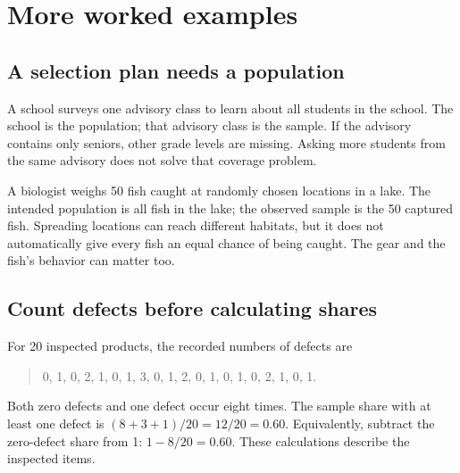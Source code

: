 \documentclass[12pt,letterpaper]{article}
\begin{document}
\section*{More worked examples}
\subsection*{A selection plan needs a population}
A school surveys one advisory class to learn about all students in the school. The school is the population; that advisory class is the sample. If the advisory contains only seniors, other grade levels are missing. Asking more students from the same advisory does not solve that coverage problem.

A biologist weighs 50 fish caught at randomly chosen locations in a lake. The intended population is all fish in the lake; the observed sample is the 50 captured fish. Spreading locations can reach different habitats, but it does not automatically give every fish an equal chance of being caught. The gear and the fish's behavior can matter too.

\subsection*{Count defects before calculating shares}
For 20 inspected products, the recorded numbers of defects are
\begin{quote}0, 1, 0, 2, 1, 0, 1, 3, 0, 1, 2, 0, 1, 0, 1, 0, 2, 1, 0, 1.\end{quote}
\par{}\par\medskip

Both zero defects and one defect occur eight times. The sample share with at least one defect is $(8+3+1)/20=12/20=0.60$. Equivalently, subtract the zero-defect share from 1: $1-8/20=0.60$. These calculations describe the inspected items.
\end{document}
